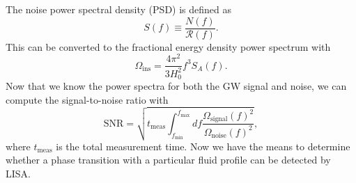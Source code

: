 The noise power spectral density (PSD) is defined as
\cite[eq. 3.1]{gowling_lisa_2021}
\begin{equation}
S(f) \equiv \frac{N(f)}{\mathcal{R}(f)}.
\end{equation}
This can be converted to the fractional energy density power spectrum with
\cites[eq. 3.8]{gowling_lisa_2021}[eq. 59]{smith_lisa_2019}
\begin{equation}
\Omega_\text{ins} = \frac{4 \pi^2}{3 H_0^2} f^3 S_A(f).
\end{equation}
Now that we know the power spectra for both the GW signal and noise, we can compute the signal-to-noise ratio with
\cites[eq. 50]{smith_lisa_2019}[eq. 33]{caprini_detecting_2020}[eq. 21]{thrane_sensitivity_2013}
\begin{equation}
\text{SNR} = \sqrt{t_\text{meas} \int_{f_\text{min}}^{f_\text{max}} df \frac{\Omega_\text{signal}(f)^2}{\Omega_\text{noise}(f)^2}},
\end{equation}
where $t_\text{meas}$ is the total measurement time.
Now we have the means to determine whether a phase transition with a particular fluid profile can be detected by LISA.
